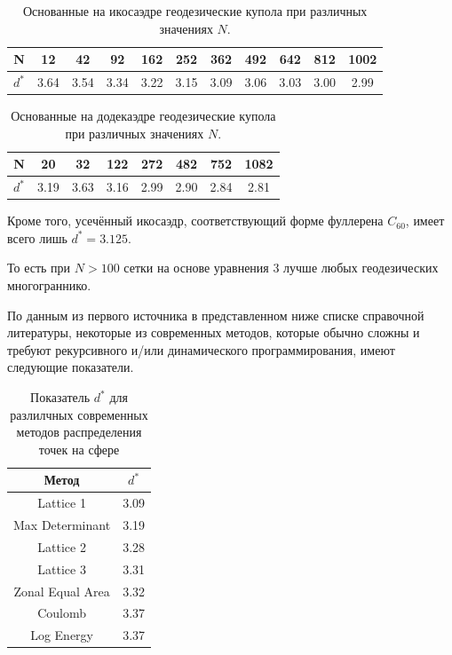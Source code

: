 \documentclass[12pt, a4paper]{article}
\begin{document}
\begin{table}[H]
\caption{Основанные на икосаэдре геодезические купола при различных значениях $N$.}
\begin{center}
\begin{tabular}{ |c|c|c|c|c|c|c|c|c|c|c| } 
\hline
N & 12 & 42 & 92 & 162 & 252 & 362 & 492 & 642 & 812 & 1002 \\
\hline
$d^*$ & 3.64 & 3.54 & 3.34 & 3.22 & 3.15 & 3.09 & 3.06 & 3.03 & 3.00 & 2.99 \\
\hline
\end{tabular}
\end{center}
\end{table}

\begin{table}[H]
\caption{Основанные на додекаэдре геодезические купола при различных значениях $N$.}
\begin{center}
\begin{tabular}{ |c|c|c|c|c|c|c|c| } 
\hline
N & 20 & 32 & 122 & 272 & 482 & 752 & 1082 \\
\hline
$d^*$ & 3.19 & 3.63 & 3.16 & 2.99 & 2.90 & 2.84 & 2.81 \\
\hline
\end{tabular}
\end{center}
\end{table}

Кроме того, усечённый икосаэдр, соответствующий форме фуллерена $C_{60}$, имеет всего лишь $d^* = 3.125$.

То есть при $N>100$ сетки на основе уравнения 3 лучше любых геодезических многограннико.

По данным из первого источника в представленном ниже списке справочной литературы, некоторые из современных методов, которые обычно сложны и требуют рекурсивного и/или динамического программирования, имеют следующие показатели.

\begin{table}[H]
\caption{Показатель $d^*$  для разлилчных современных методов распределения точек на сфере}
\begin{center}
\begin{tabular}{ |c|c| } 
\hline
Метод &  $d^*$ \\
\hline
Lattice 1 & 3.09 \\
\hline
Max Determinant & 3.19 \\
\hline
Lattice 2 & 3.28 \\
\hline
Lattice 3 & 3.31 \\
\hline
Zonal Equal Area & 3.32 \\
\hline
Coulomb & 3.37 \\
\hline
Log Energy & 3.37 \\
\hline
\end{tabular}
\end{center}
\end{table}
\end{document}
